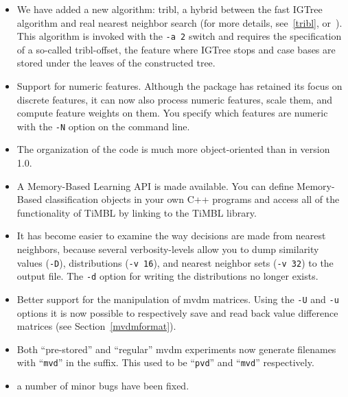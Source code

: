 \documentclass{book}
\begin{document}
\begin{itemize}

\item We have added a new algorithm: {\sc tribl}, a hybrid between
the fast {\sc IGTree} algorithm and real nearest neighbor search (for
more details, see~\ref{tribl}, or~). This
algorithm is invoked with the {\tt -a 2} switch and requires the
specification of a so-called {\sc tribl}-offset, the feature where
{\sc IGTree} stops and case bases are stored under the leaves of the
constructed tree.

\item Support for numeric features. Although the package has retained
its focus on discrete features, it can now also process numeric
features, scale them, and compute feature weights on them. You
specify which features are numeric with the {\tt -N} option on the
command line.

\item The organization of the code is much more object-oriented than
in version 1.0. 

\item A Memory-Based Learning API is made available. You can define
Memory-Based classification objects in your own C++ programs and
access all of the functionality of TiMBL by linking to the TiMBL
library.

\item It has become easier to examine the way decisions are made from
nearest neighbors, because several verbosity-levels allow you to dump
similarity values ({\tt -D}), distributions ({\tt -v 16}), and nearest
neighbor sets ({\tt -v 32}) to the output file. The {\tt -d} option
for writing the distributions no longer exists.

\item Better support for the manipulation of {\sc mvdm}
matrices. Using the {\tt -U} and {\tt -u} options it is now possible
to respectively save and read back value difference matrices (see
Section~\ref{mvdmformat}).

\item Both ``pre-stored'' and ``regular'' {\sc mvdm} experiments now
generate filenames with ``{\tt mvd}'' in the suffix. This used to be
``{\tt pvd}'' and ``{\tt mvd}'' respectively.

\item a number of minor bugs have been fixed.

\end{itemize}
\end{document}

